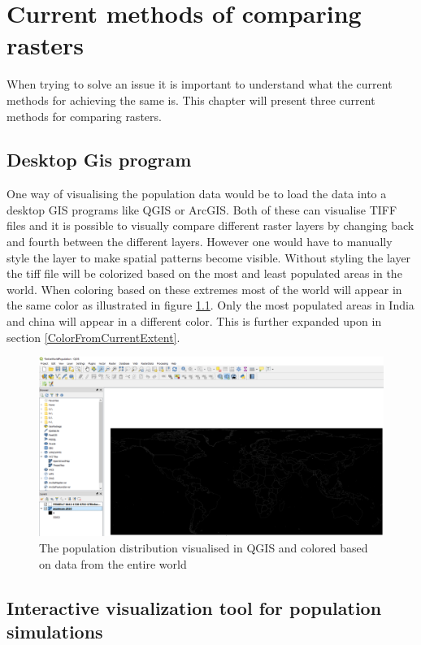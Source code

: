 \chapter{Current methods of comparing rasters}\label{CCurrentSolution}

When trying to solve an issue it is important to understand what the current methods for achieving the same is. This chapter will present three current methods for comparing rasters.

\section{Desktop Gis program}

One way of visualising the population data would be to load the data into a desktop GIS programs like QGIS or ArcGIS. Both of these can visualise TIFF files and it is possible to visually compare different raster layers by changing back and fourth between the different layers. However one would have to manually style the layer to make spatial patterns become visible. Without styling the layer the tiff file will be colorized based on the most and least populated areas in the world. When coloring based on these extremes most of the world will appear in the same color as illustrated in figure \ref{QGIS}. Only the most populated areas in India and china will appear in a different color. This is further expanded upon in section \ref{ColorFromCurrentExtent}.

\begin{figure} [H]
	\centering
	\includegraphics[width=.8\textwidth]{Pictures/QGIS}
	\caption{The population distribution visualised in QGIS and colored based on data from the entire world}
	\label{QGIS}
\end{figure}

\section{Interactive visualization tool for population simulations}

